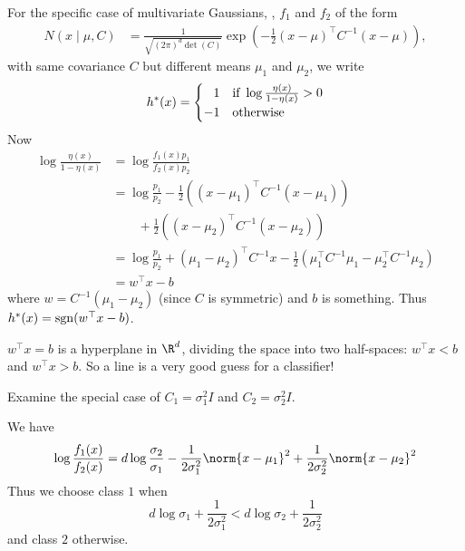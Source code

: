 For the specific case of multivariate Gaussians, \ie, $f_1$ and $f_2$ of the
form \begin{align*}
    N(x \mid \mu, C) &= \frac{1}{\sqrt{(2\pi)^d \det(C)}}
        \exp\left(-\frac{1}{2}(x - \mu)^\top C^{-1} (x - \mu)\right),
\end{align*} with same covariance $C$ but different means $\mu_1$ and $\mu_2$,
we write \[
    h^*(x) = \begin{cases}
        \hphantom{-}1 & \text{if } \log \frac{\eta(x)}{1 - \eta(x)} > 0 \\
        -1 & \text{otherwise}
    \end{cases}
\] Now \begin{align*}
    \log \frac{\eta(x)}{1 - \eta(x)}
        &= \log \frac{f_1(x) p_1}{f_2(x) p_2} \\
        &= \log \frac{p_1}{p_2} - \frac12 \left((x-\mu_1)^\top C^{-1}(x-\mu_1)\right) \\
        &\qquad + \frac12 \left((x-\mu_2)^\top C^{-1}(x-\mu_2)\right) \\
        &= \log \frac{p_1}{p_2} + (\mu_1 - \mu_2)^\top C^{-1} x
            - \frac12 (\mu_1^\top C^{-1} \mu_1 - \mu_2^\top C^{-1} \mu_2) \\
        &= w^\top x - b
\end{align*} where $w = C^{-1}(\mu_1 - \mu_2)$ (since $C$ is symmetric) and
$b$ is something.
Thus $h^*(x) = \operatorname{sgn}(w^\top x - b)$.
\begin{remark}
    $w^\top x = b$ is a hyperplane in $\R^d$, dividing the space into two
    half-spaces: $w^\top x < b$ and $w^\top x > b$.
    So a line is a very good guess for a classifier!
\end{remark}

\begin{exercise}
    Examine the special case of $C_1 = \sigma_1^2 I$ and
    $C_2 = \sigma_2^2 I$.
\end{exercise}
\begin{solution}
    We have \begin{equation*}
        \log \frac{f_1(x)}{f_2(x)}
            = d \log \frac{\sigma_2}{\sigma_1}
                - \frac{1}{2\sigma_1^2} \norm{x - \mu_1}^2
                + \frac{1}{2\sigma_2^2} \norm{x - \mu_2}^2
    \end{equation*}
    Thus we choose class $1$ when \[
        d \log \sigma_1 + \frac{1}{2\sigma_1^2}
            < d \log \sigma_2 + \frac{1}{2\sigma_2^2}
    \] and class $2$ otherwise.
\end{solution}

